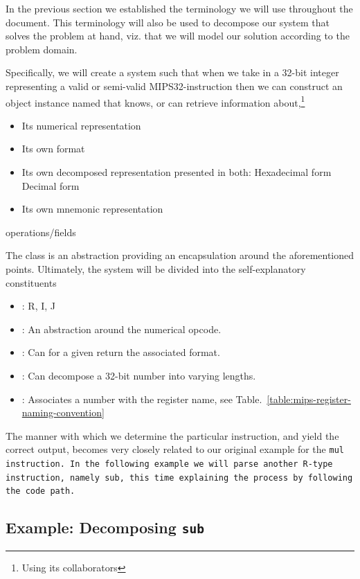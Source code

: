 In the previous section we established the terminology we will use
throughout the document. This terminology will also be used to
decompose our system that solves the problem at hand, viz. that
we will model our solution according to the problem domain.

Specifically, we will create a system such that when we take in a
32-bit integer representing a valid or semi-valid MIPS32-instruction
then we can construct an object instance named  that
knows, or can retrieve information about,\footnote{Using its
collaborators}

\begin{table}
\begin{itemize}
\item Its numerical representation
\item Its own format
\item Its own decomposed representation presented in both:
\subitem Hexadecimal form
\subitem Decimal form
\item Its own mnemonic representation
\end{itemize}
\caption{ operations/fields}
\label{table:instruction-operations}
\end{table}
The  class is an abstraction providing an
encapsulation around the aforementioned points. Ultimately, the system
will be divided into the self-explanatory constituents

\begin{itemize}
\item \formatm: R, I, J
\item \opcodem: An abstraction around the numerical opcode.
\item \formatm: Can for a given \opcodem return the associated format.
\item \decomposedm: Can decompose a 32-bit number into varying lengths.
\item \registerm: Associates a number with the register name, see Table.~\ref{table:mips-register-naming-convention}
\end{itemize}

The manner with which we determine the particular instruction, and
yield the correct output, becomes very closely related to our original
example for the \tt{mul} instruction. In the following example we will
parse another R-type instruction, namely \tt{sub}, this time
explaining the process by following the code path.

\subsection{Example: Decomposing \texttt{sub}}

